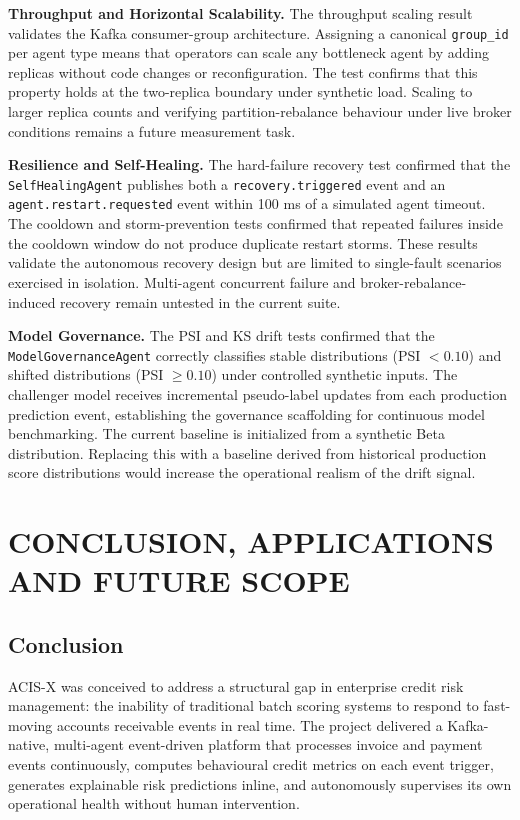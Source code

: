 \documentclass[a4paper, 12pt]{report}
\begin{document}
\noindent \textbf{Throughput and Horizontal Scalability.}
The throughput scaling result validates the Kafka consumer-group architecture. Assigning a canonical \texttt{group\_id} per agent type means that operators can scale any bottleneck agent by adding replicas without code changes or reconfiguration. The test confirms that this property holds at the two-replica boundary under synthetic load. Scaling to larger replica counts and verifying partition-rebalance behaviour under live broker conditions remains a future measurement task.

\noindent \textbf{Resilience and Self-Healing.}
The hard-failure recovery test confirmed that the \texttt{SelfHealingAgent} publishes both a \texttt{recovery.triggered} event and an \texttt{agent.restart.requested} event within 100 ms of a simulated agent timeout. The cooldown and storm-prevention tests confirmed that repeated failures inside the cooldown window do not produce duplicate restart storms. These results validate the autonomous recovery design but are limited to single-fault scenarios exercised in isolation. Multi-agent concurrent failure and broker-rebalance-induced recovery remain untested in the current suite.

\noindent \textbf{Model Governance.}
The PSI and KS drift tests confirmed that the \texttt{ModelGovernanceAgent} correctly classifies stable distributions (PSI $< 0.10$) and shifted distributions (PSI $\geq 0.10$) under controlled synthetic inputs. The challenger model receives incremental pseudo-label updates from each production prediction event, establishing the governance scaffolding for continuous model benchmarking. The current baseline is initialized from a synthetic Beta distribution. Replacing this with a baseline derived from historical production score distributions would increase the operational realism of the drift signal.

\chapter{CONCLUSION, APPLICATIONS AND FUTURE SCOPE}
\thispagestyle{chapterfirstpage}

\section{Conclusion}
ACIS-X was conceived to address a structural gap in enterprise credit risk management: the inability of traditional batch scoring systems to respond to fast-moving accounts receivable events in real time. The project delivered a Kafka-native, multi-agent event-driven platform that processes invoice and payment events continuously, computes behavioural credit metrics on each event trigger, generates explainable risk predictions inline, and autonomously supervises its own operational health without human intervention.
\end{document}
